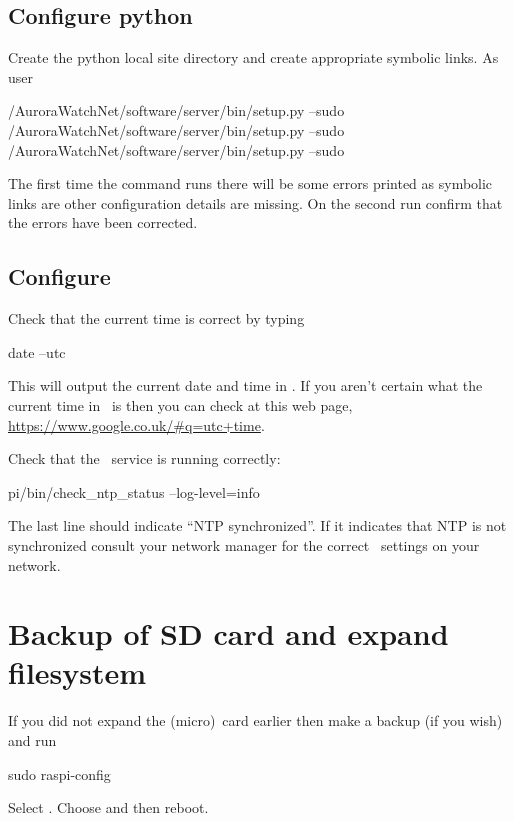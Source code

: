 \subsection{Configure python}

Create the python local site directory and create appropriate symbolic
links. As user \piUser
\begin{Cmd}
\mytilde/AuroraWatchNet/software/server/bin/setup.py --sudo
\mytilde/AuroraWatchNet/software/server/bin/setup.py --sudo
\mytilde/AuroraWatchNet/software/server/bin/setup.py --sudo
\end{Cmd}

The first time the command runs there will be some errors printed as
symbolic links are other configuration details are missing. On the
second run confirm that the errors have been corrected.


\subsection{Configure \protect{}}
Check that the current time is correct by typing
\begin{Cmd}
date --utc
\end{Cmd}
This will output the current date and time in \utc. If you aren't
certain what the current time in \utc\ is then you can check at this
web page, \url{https://www.google.co.uk/#q=utc+time}.

Check that the \ntp\ service is running correctly:
\begin{Cmd}
\mytilde{}pi/bin/check_ntp_status --log-level=info
\end{Cmd}
The last line should indicate ``NTP synchronized''. If it indicates
that NTP is not synchronized consult your network manager for the
correct \ntp\ settings on your network.



\section{Backup of SD card and expand filesystem}

If you did not expand the (micro)\sd\ card earlier then make a backup
(if you wish) and run
\begin{Cmd}
sudo raspi-config
\end{Cmd}
Select . Choose  and then reboot.
